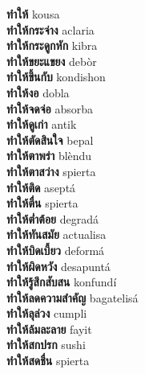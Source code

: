 \textbf{ ทำให้  } kousa \\
\textbf{ ทำให้กระจ่าง  } aclaria \\
\textbf{ ทำให้กระดูกหัก  } kibra \\
\textbf{ ทำให้ขยะแขยง  } debòr \\
\textbf{ ทำให้ขึ้นกับ  } kondishon \\
\textbf{ ทำให้งอ  } dobla \\
\textbf{ ทำให้จดจ่อ  } absorba \\
\textbf{ ทำให้ดูเก่า  } antik \\
\textbf{ ทำให้ตัดสินใจ  } bepal \\
\textbf{ ทำให้ตาพร่า  } blèndu \\
\textbf{ ทำให้ตาสว่าง  } spierta \\
\textbf{ ทำให้ติด  } aseptá \\
\textbf{ ทำให้ตื่น  } spierta \\
\textbf{ ทำให้ต่ำต้อย  } degradá \\
\textbf{ ทำให้ทันสมัย  } actualisa \\
\textbf{ ทำให้บิดเบี้ยว  } deformá \\
\textbf{ ทำให้ผิดหวัง  } desapuntá \\
\textbf{ ทำให้รู้สึกสับสน  } konfundí \\
\textbf{ ทำให้ลดความสำคัญ  } bagatelisá \\
\textbf{ ทำให้ลุล่วง  } cumpli \\
\textbf{ ทำให้ล้มละลาย  } fayit \\
\textbf{ ทำให้สกปรก  } sushi \\
\textbf{ ทำให้สดชื่น  } spierta \\
